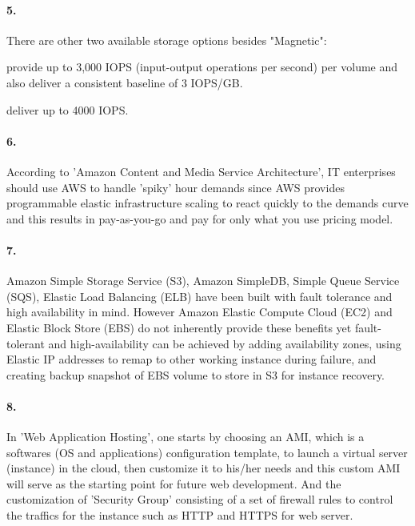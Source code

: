 \documentclass[a4paper]{article}
\begin{document}
\paragraph{5. } There are other two available storage options besides "Magnetic":
\begin{description}
\leftskip 0.4in
\parindent -0.4in
	\item[General Purpose (SSD): ] provide up to 3,000 IOPS (input-output operations per second) per volume and also deliver a consistent baseline of 3 IOPS/GB.
	\item[Provisioned IOPS (SSD): ] deliver up to 4000 IOPS.
\end{description}

\paragraph{6. } According to 'Amazon Content and Media Service Architecture', IT enterprises should use AWS to handle 'spiky' hour demands since AWS provides programmable elastic infrastructure scaling to react quickly to the demands curve and this results in pay-as-you-go and pay for only what you use pricing model.

\paragraph{7. } Amazon Simple Storage Service (S3), Amazon SimpleDB, Simple Queue Service (SQS), Elastic Load Balancing (ELB) have been built with fault tolerance and high availability in mind. However Amazon Elastic Compute Cloud (EC2) and Elastic Block Store (EBS) do not inherently provide these benefits yet fault-tolerant and high-availability can be achieved by adding availability zones, using Elastic IP addresses to remap to other working instance during failure, and creating backup snapshot of EBS volume to store in S3 for instance recovery.

\paragraph{8. } In 'Web Application Hosting', one starts by choosing an AMI, which is a softwares (OS and applications) configuration template, to launch a virtual server (instance) in the cloud, then customize it to his/her needs and this custom AMI will serve as the starting point for future web development. And the customization of 'Security Group' consisting of a set of firewall rules to control the traffics for the instance such as HTTP and HTTPS for web server.
\end{document}
